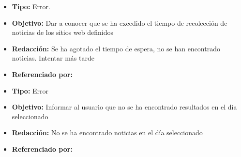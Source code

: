   
    \begin{itemize}
      \item \textbf{Tipo:} Error. 
      \item \textbf{Objetivo:}  Dar a conocer que se ha excedido el tiempo de recolección de noticias de los sitios web definidos
      \item \textbf{Redacción:} Se ha agotado el tiempo de espera, no se han encontrado noticias. Intentar más tarde
      \item \textbf{Referenciado por:} \\
    \end{itemize}

  \begin{itemize}
    \item \textbf{Tipo:} Error
    \item \textbf{Objetivo:}  Informar al usuario que no se ha encontrado resultados en el día seleccionado
    \item \textbf{Redacción:}  No se ha encontrado noticias en el día seleccionado

    \item \textbf{Referenciado por:} \\
  \end{itemize}


